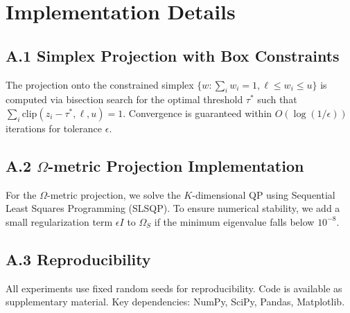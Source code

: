 \documentclass[10pt,twocolumn,a4paper]{article}
\begin{document}
\appendix
\section{Implementation Details}

\subsection*{A.1 Simplex Projection with Box Constraints}

The projection onto the constrained simplex $\{w : \sum_i w_i = 1, \ell \leq w_i \leq u\}$ is computed via bisection search for the optimal threshold $\tau^*$ such that $\sum_i \text{clip}(z_i - \tau^*, \ell, u) = 1$. Convergence is guaranteed within $O(\log(1/\epsilon))$ iterations for tolerance $\epsilon$.

\subsection*{A.2 $\Omega$-metric Projection Implementation}

For the $\Omega$-metric projection, we solve the $K$-dimensional QP using Sequential Least Squares Programming (SLSQP). To ensure numerical stability, we add a small regularization term $\epsilon I$ to $\Omega_S$ if the minimum eigenvalue falls below $10^{-8}$.

\subsection*{A.3 Reproducibility}

All experiments use fixed random seeds for reproducibility. Code is available as supplementary material. Key dependencies: NumPy, SciPy, Pandas, Matplotlib.
\end{document}
